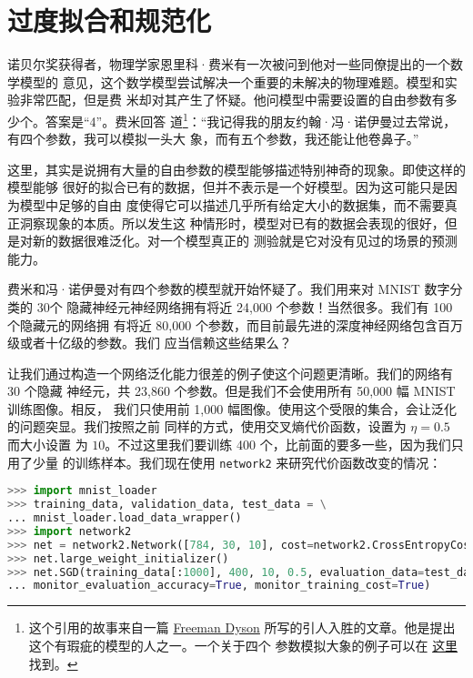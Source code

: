 \section{过度拟合和规范化}
\label{sec:overfitting_and_regularization}

诺贝尔奖获得者，物理学家恩里科·费米有一次被问到他对一些同僚提出的一个数学模型的
意见，这个数学模型尝试解决一个重要的未解决的物理难题。模型和实验非常匹配，但是费
米却对其产生了怀疑。他问模型中需要设置的自由参数有多少个。答案是“4”。费米回答
道\footnote{这个引用的故事来自一篇
  \href{http://www.nature.com/nature/journal/v427/n6972/full/427297a.html}{Freeman
    Dyson} 所写的引人入胜的文章。他是提出这个有瑕疵的模型的人之一。一个关于四个
  参数模拟大象的例子可以在%
  \href{http://www.johndcook.com/blog/2011/06/21/how-to-fit-an-elephant/}{这里}
  找到。}：“我记得我的朋友约翰·冯·诺伊曼过去常说，有四个参数，我可以模拟一头大
象，而有五个参数，我还能让他卷鼻子。”

这里，其实是说拥有大量的自由参数的模型能够描述特别神奇的现象。即使这样的模型能够
很好的拟合已有的数据，但并不表示是一个好模型。因为这可能只是因为模型中足够的自由
度使得它可以描述几乎所有给定大小的数据集，而不需要真正洞察现象的本质。所以发生这
种情形时，模型对已有的数据会表现的很好，但是对新的数据很难泛化。对一个模型真正的
测验就是它对没有见过的场景的预测能力。

费米和冯·诺伊曼对有四个参数的模型就开始怀疑了。我们用来对 MNIST 数字分类的 30个
隐藏神经元神经网络拥有将近 24,000 个参数！当然很多。我们有 100 个隐藏元的网络拥
有将近 80,000 个参数，而目前最先进的深度神经网络包含百万级或者十亿级的参数。我们
应当信赖这些结果么？

让我们通过构造一个网络泛化能力很差的例子使这个问题更清晰。我们的网络有 30 个隐藏
神经元，共 23,860 个参数。但是我们不会使用所有 50,000 幅 MNIST 训练图像。相反，
我们只使用前 1,000 幅图像。使用这个受限的集合，会让泛化的问题突显。我们按照之前
同样的方式，使用交叉熵代价函数，\learningrate{}设置为 $\eta = 0.5$ 而\minibatch{}大小设置
为 $10$。不过这里我们要训练 400 个\epochs{}，比前面的要多一些，因为我们只用了少量
的训练样本。我们现在使用 \lstinline!network2! 来研究代价函数改变的情况：

\begin{lstlisting}[language=Python]
>>> import mnist_loader
>>> training_data, validation_data, test_data = \
... mnist_loader.load_data_wrapper()
>>> import network2
>>> net = network2.Network([784, 30, 10], cost=network2.CrossEntropyCost)
>>> net.large_weight_initializer()
>>> net.SGD(training_data[:1000], 400, 10, 0.5, evaluation_data=test_data,
... monitor_evaluation_accuracy=True, monitor_training_cost=True)
\end{lstlisting}

